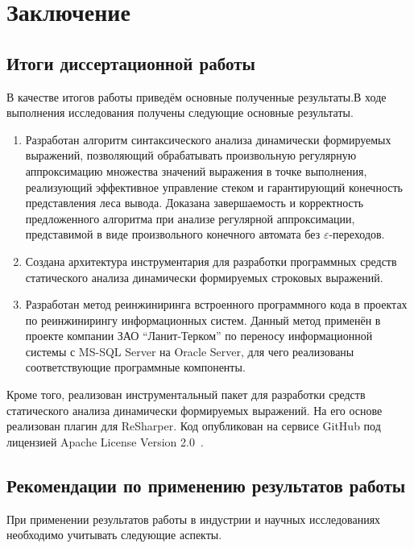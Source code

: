 \chapter*{Заключение}                       %

\section*{Итоги диссертационной работы}

В качестве итогов работы приведём основные полученные результаты.В ходе выполнения исследования получены следующие основные результаты.

\begin{enumerate}
    \item Разработан алгоритм синтаксического анализа динамически формируемых выражений, позволяющий обрабатывать произвольную регулярную аппроксимацию множества значений выражения в точке выполнения, реализующий 
    эффективное управление стеком и гарантирующий конечность представления леса вывода. Доказана завершаемость и корректность предложенного алгоритма при анализе регулярной аппроксимации, представимой в виде произвольного конечного автомата без $\varepsilon$-переходов.
    \item Создана архитектура инструментария для разработки программных средств статического анализа динамически формируемых строковых выражений.
    \item Разработан метод реинжиниринга встроенного программного кода в проектах по реинжинирингу информационных систем. Данный метод применён в проекте компании ЗАО ``Ланит-Терком'' по переносу информационной системы с MS-SQL Server на Oracle Server, для чего реализованы соответствующие программные компоненты.
\end{enumerate}

Кроме того, реализован инструментальный пакет для разработки средств статического анализа динамически формируемых выражений. На его основе реализован плагин для ReSharper. Код опубликован на сервисе GitHub под лицензией Apache License Version 2.0~\cite{YCUrl}.

\section*{Рекомендации по применению результатов работы}

При применении результатов работы в индустрии и научных исследованиях необходимо учитывать следующие аспекты.

